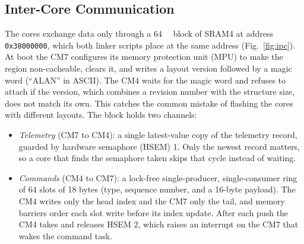 \subsection{Inter-Core Communication}
\label{sec:ipc}
The cores exchange data only through a \SI{64}{\kilo\byte} block of SRAM4 at
address \texttt{0x38000000}, which both linker scripts place at the same
address (Fig.~\ref{fig:ipc}). At boot the CM7 configures its memory protection
unit (MPU) to make the region non-cacheable, clears it, and writes a layout
version followed by a magic word (``ALAN'' in ASCII). The CM4 waits for the
magic word and refuses to attach if the version, which combines a revision
number with the structure size, does not match its own. This catches the
common mistake of flashing the cores with different layouts. The block holds
two channels:
\begin{itemize}
\item \emph{Telemetry} (CM7 to CM4): a single latest-value copy of the
telemetry record, guarded by hardware semaphore (HSEM) 1. Only the newest
record matters, so a core that finds the semaphore taken skips that cycle
instead of waiting.
\item \emph{Commands} (CM4 to CM7): a lock-free single-producer,
single-consumer ring of 64 slots of 18 bytes (type, sequence number, and a
16-byte payload). The CM4 writes only the head index and the CM7 only the
tail, and memory barriers order each slot write before its index update.
After each push the CM4 takes and releases HSEM 2, which raises an interrupt
on the CM7 that wakes the command task.
\end{itemize}

